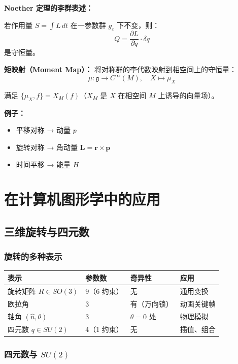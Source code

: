 \textbf{Noether 定理的李群表述：}

若作用量 $S = \int L\,dt$ 在一参数群 $g_\varepsilon$ 下不变，则：
\[
Q = \frac{\partial L}{\partial \dot{q}} \cdot \delta q
\]
是守恒量。

\textbf{矩映射（Moment Map）：} 将对称群的李代数映射到相空间上的守恒量：
\[
\mu: \mathfrak{g} \to C^\infty(M), \quad X \mapsto \mu_X
\]

满足 $\{\mu_X, f\} = X_M(f)$（$X_M$ 是 $X$ 在相空间 $M$ 上诱导的向量场）。

\textbf{例子：}
\begin{itemize}
  \item 平移对称 → 动量 $p$
  \item 旋转对称 → 角动量 $\mathbf{L} = \mathbf{r} \times \mathbf{p}$
  \item 时间平移 → 能量 $H$
\end{itemize}

\section{在计算机图形学中的应用}

\subsection{三维旋转与四元数}

\subsubsection{旋转的多种表示}

\begin{center}
\begin{tabular}{L{3cm}L{3cm}L{3cm}L{3cm}}
\toprule
\textbf{表示} & \textbf{参数数} & \textbf{奇异性} & \textbf{应用} \\
\midrule
旋转矩阵 $R \in SO(3)$ & 9（6 约束） & 无 & 通用变换 \\
欧拉角 & 3 & 有（万向锁） & 动画关键帧 \\
轴角 $(\hat{n}, \theta)$ & 3 & $\theta = 0$ 处 & 物理模拟 \\
四元数 $q \in SU(2)$ & 4（1 约束） & 无 & 插值、组合 \\
\bottomrule
\end{tabular}
\end{center}

\subsubsection{四元数与 $SU(2)$}

